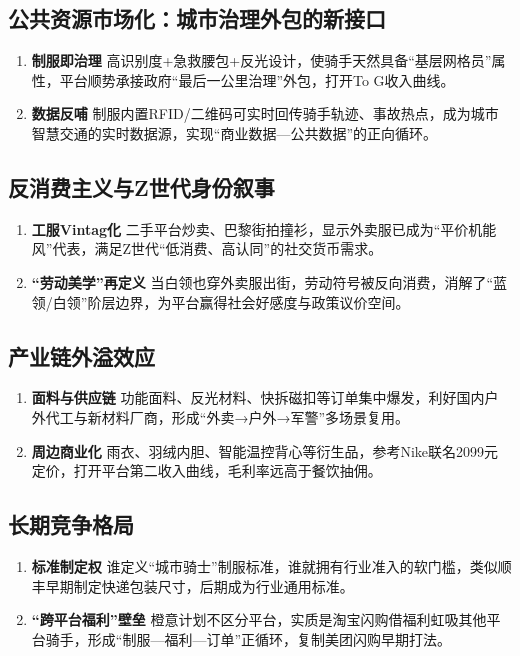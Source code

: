 \subsection{公共资源市场化：城市治理外包的新接口}
\begin{enumerate}[leftmargin=*, nosep]
    \item \textbf{制服即治理}  
    高识别度+急救腰包+反光设计，使骑手天然具备“基层网格员”属性，平台顺势承接政府“最后一公里治理”外包，打开To G收入曲线。
    \item \textbf{数据反哺}  
    制服内置RFID/二维码可实时回传骑手轨迹、事故热点，成为城市智慧交通的实时数据源，实现“商业数据—公共数据”的正向循环。
\end{enumerate}

\subsection{反消费主义与Z世代身份叙事}
\begin{enumerate}[leftmargin=*, nosep]
    \item \textbf{工服Vintag化}  
    二手平台炒卖、巴黎街拍撞衫，显示外卖服已成为“平价机能风”代表，满足Z世代“低消费、高认同”的社交货币需求。
    \item \textbf{“劳动美学”再定义}  
    当白领也穿外卖服出街，劳动符号被反向消费，消解了“蓝领/白领”阶层边界，为平台赢得社会好感度与政策议价空间。
\end{enumerate}

\subsection{产业链外溢效应}
\begin{enumerate}[leftmargin=*, nosep]
    \item \textbf{面料与供应链}  
    功能面料、反光材料、快拆磁扣等订单集中爆发，利好国内户外代工与新材料厂商，形成“外卖→户外→军警”多场景复用。
    \item \textbf{周边商业化}  
    雨衣、羽绒内胆、智能温控背心等衍生品，参考Nike联名2099元定价，打开平台第二收入曲线，毛利率远高于餐饮抽佣。
\end{enumerate}

\subsection{长期竞争格局}
\begin{enumerate}[leftmargin=*, nosep]
    \item \textbf{标准制定权}  
    谁定义“城市骑士”制服标准，谁就拥有行业准入的软门槛，类似顺丰早期制定快递包装尺寸，后期成为行业通用标准。
    \item \textbf{“跨平台福利”壁垒}  
    橙意计划不区分平台，实质是淘宝闪购借福利虹吸其他平台骑手，形成“制服—福利—订单”正循环，复制美团闪购早期打法。
\end{enumerate}

